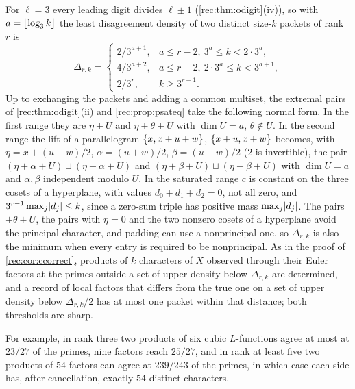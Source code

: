 \begin{remark}\label{rec:cor:ocubicmin}
For $\ell=3$ every leading digit divides $\ell\pm1$ (\cref{rec:thm:odigit}(iv)), so with $a=\lfloor\log_3k\rfloor$ the least
disagreement density of two distinct size-$k$ packets of rank $r$ is
\[
 \Delta_{r,k}=\begin{cases}2/3^{a+1},&a\le r-2,\ 3^a\le k<2\cdot3^a,\\ 4/3^{a+2},&a\le r-2,\ 2\cdot3^a\le k<3^{a+1},\\ 2/3^r,&k\ge3^{r-1}.\end{cases}
\]
Up to exchanging the packets and adding a common multiset, the extremal pairs of \cref{rec:thm:odigit}(ii) and
\cref{rec:prop:psateq} take the following normal form. In the first range they are $\eta+U$ and $\eta+\theta+U$ with
$\dim U=a$, $\theta\notin U$. In the second range the lift of a parallelogram $\{x,x+u+w\}$, $\{x+u,x+w\}$ becomes, with
$\eta=x+(u+w)/2$, $\alpha=(u+w)/2$, $\beta=(u-w)/2$ ($2$ is invertible), the pair $(\eta+\alpha+U)\sqcup(\eta-\alpha+U)$ and
$(\eta+\beta+U)\sqcup(\eta-\beta+U)$ with $\dim U=a$ and $\alpha,\beta$ independent modulo $U$. In the saturated range $c$ is
constant on the three cosets of a hyperplane, with values $d_0+d_1+d_2=0$, not all zero, and $3^{r-1}\max_j\lvert d_j\rvert\le k$,
since a zero-sum triple has positive mass $\max_j\lvert d_j\rvert$. The pairs $\pm\theta+U$, the pairs with $\eta=0$ and the two
nonzero cosets of a hyperplane avoid the principal character, and padding can use a nonprincipal one, so $\Delta_{r,k}$
is also the minimum when every entry is required to be nonprincipal. As in the proof of \cref{rec:cor:ccorrect},
products of $k$ characters of $X$ observed through their Euler factors at the primes outside a set of upper
density below $\Delta_{r,k}$ are determined, and a record of local factors that differs from the true one on a set of
upper density below $\Delta_{r,k}/2$ has at most one packet within that distance; both thresholds are sharp.
\end{remark}

For example, in rank three two products of six cubic $L$-functions agree at most at $23/27$ of the primes,
nine factors reach $25/27$, and in rank at least five two products of $54$ factors can agree at $239/243$ of the
primes, in which case each side has, after cancellation, exactly $54$ distinct characters.

